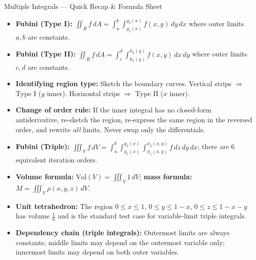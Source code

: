 \documentclass[12pt,a4paper]{article}
\begin{document}
\begin{learnbox}{Multiple Integrals --- Quick Recap \& Formula Sheet}
\begin{itemize}
  \item \textbf{Fubini (Type I):} \(\displaystyle\iint_R f\,dA = \int_a^b\int_{g_1(x)}^{g_2(x)} f(x,y)\,dy\,dx\) where outer limits \(a,b\) are constants.

  \item \textbf{Fubini (Type II):} \(\displaystyle\iint_R f\,dA = \int_c^d\int_{h_1(y)}^{h_2(y)} f(x,y)\,dx\,dy\) where outer limits \(c,d\) are constants.

  \item \textbf{Identifying region type:} Sketch the boundary curves. Vertical strips \(\Rightarrow\) Type I (\(y\) inner). Horizontal strips \(\Rightarrow\) Type II (\(x\) inner).

  \item \textbf{Change of order rule:} If the inner integral has no closed-form antiderivative, re-sketch the region, re-express the same region in the reversed order, and rewrite \emph{all} limits. Never swap only the differentials.

  \item \textbf{Fubini (Triple):} \(\displaystyle\iiint_V f\,dV = \int_a^b\int_{g_1(x)}^{g_2(x)}\int_{\phi_1(x,y)}^{\phi_2(x,y)} f\,dz\,dy\,dx\); there are 6 equivalent iteration orders.

  \item \textbf{Volume formula:} \(\text{Vol}(V) = \iiint_V 1\,dV\); \textbf{mass formula:} \(M = \iiint_V \rho(x,y,z)\,dV\).

  \item \textbf{Unit tetrahedron:} The region \(0\le x\le 1\), \(0\le y\le 1-x\), \(0\le z\le 1-x-y\) has volume \(\frac{1}{6}\) and is the standard test case for variable-limit triple integrals.

  \item \textbf{Dependency chain (triple integrals):} Outermost limits are always constants; middle limits may depend on the outermost variable only; innermost limits may depend on both outer variables.
\end{itemize}
\end{learnbox}
\end{document}
